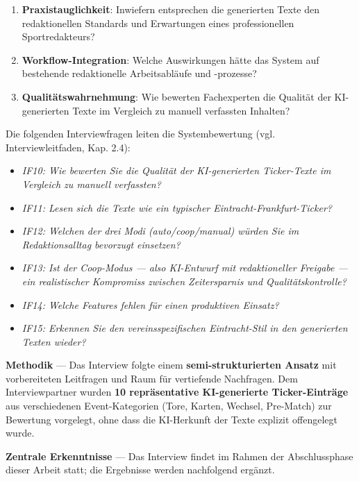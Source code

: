 \begin{enumerate}
\def\labelenumi{\arabic{enumi}.}
\tightlist
\item
  \textbf{Praxistauglichkeit}: Inwiefern entsprechen die generierten
  Texte den redaktionellen Standards und Erwartungen eines
  professionellen Sportredakteurs?
\item
  \textbf{Workflow-Integration}: Welche Auswirkungen hätte das System
  auf bestehende redaktionelle Arbeitsabläufe und -prozesse?
\item
  \textbf{Qualitätswahrnehmung}: Wie bewerten Fachexperten die Qualität
  der KI-generierten Texte im Vergleich zu manuell verfassten Inhalten?
\end{enumerate}

Die folgenden Interviewfragen leiten die Systembewertung (vgl.
Interviewleitfaden, Kap. 2.4):

\begin{itemize}
\tightlist
\item
  \emph{IF10: Wie bewerten Sie die Qualität der KI-generierten
  Ticker-Texte im Vergleich zu manuell verfassten?}
\item
  \emph{IF11: Lesen sich die Texte wie ein typischer
  Eintracht-Frankfurt-Ticker?}
\item
  \emph{IF12: Welchen der drei Modi (auto/coop/manual) würden Sie im
  Redaktionsalltag bevorzugt einsetzen?}
\item
  \emph{IF13: Ist der Coop-Modus --- also KI-Entwurf mit redaktioneller
  Freigabe --- ein realistischer Kompromiss zwischen Zeitersparnis und
  Qualitätskontrolle?}
\item
  \emph{IF14: Welche Features fehlen für einen produktiven Einsatz?}
\item
  \emph{IF15: Erkennen Sie den vereinsspezifischen Eintracht-Stil in den
  generierten Texten wieder?}
\end{itemize}

\textbf{Methodik} --- Das Interview folgte einem
\textbf{semi-strukturierten Ansatz} mit vorbereiteten Leitfragen und
Raum für vertiefende Nachfragen. Dem Interviewpartner wurden \textbf{10
repräsentative KI-generierte Ticker-Einträge} aus verschiedenen
Event-Kategorien (Tore, Karten, Wechsel, Pre-Match) zur Bewertung
vorgelegt, ohne dass die KI-Herkunft der Texte explizit offengelegt
wurde.

\textbf{Zentrale Erkenntnisse} --- Das Interview findet im Rahmen der
Abschlussphase dieser Arbeit statt; die Ergebnisse werden nachfolgend
ergänzt.

